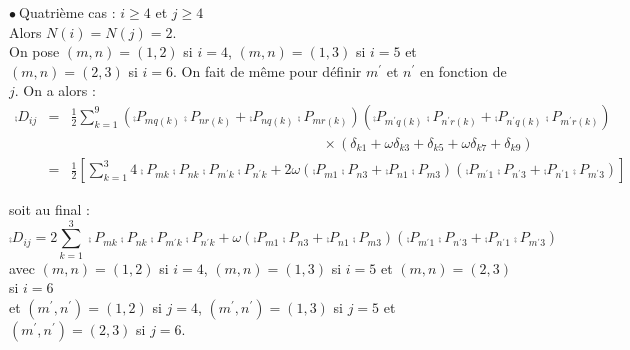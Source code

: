 \vspace{1cm}
$\bullet\ ${\sc Quatri\`eme cas} : $i\geqslant 4$ et $j\geqslant 4$\\
Alors $N(i)=N(j)=2$.\\
On pose $(m,n)=(1,2)$ si $i=4$, $(m,n)=(1,3)$ si $i=5$ et 
$(m,n)=(2,3)$ si $i=6$. On fait de m\^eme pour d\'efinir $m^\prime$ et
$n^\prime$ en fonction de $j$. On a alors :
\begin{eqnarray}
\comp{D}_{ij}&=&\frac{1}{2}\sum_{k=1}^9
\left(\comp{P}_{mq(k)}\comp{P}_{nr(k)}+\comp{P}_{nq(k)}\comp{P}_{mr(k)}\right)
\left(\comp{P}_{m^\prime q(k)}\comp{P}_{n^\prime r(k)}
+\comp{P}_{n^\prime q(k)}\comp{P}_{m^\prime r(k)}\right)\nonumber\\
&&\qquad\qquad\qquad\qquad\qquad\qquad\qquad\qquad\qquad\times
(\delta_{k1}+\omega\delta_{k3}+\delta_{k5}+\omega\delta_{k7}+\delta_{k9})\nonumber\\ 
&=&\frac{1}{2}\left[
\sum_{k=1}^3 4\comp{P}_{mk}\comp{P}_{nk}
\comp{P}_{m^\prime k}\comp{P}_{n^\prime k}
+2\omega\left(\comp{P}_{m1}\comp{P}_{n3}+\comp{P}_{n1}\comp{P}_{m3}\right)
\left(\comp{P}_{m^\prime 1}\comp{P}_{n^\prime 3}
+\comp{P}_{n^\prime 1}\comp{P}_{m^\prime 3}\right)\right]
\end{eqnarray}

soit au final :
\begin{equation}
\comp{D}_{ij}=
2\sum_{k=1}^3 \comp{P}_{mk}\comp{P}_{nk}
\comp{P}_{m^\prime k}\comp{P}_{n^\prime k}
+\omega\left(\comp{P}_{m1}\comp{P}_{n3}+\comp{P}_{n1}\comp{P}_{m3}\right)
\left(\comp{P}_{m^\prime 1}\comp{P}_{n^\prime 3}
+\comp{P}_{n^\prime 1}\comp{P}_{m^\prime 3}\right)
\end{equation}
avec $(m,n)=(1,2)$ si $i=4$, $(m,n)=(1,3)$ si $i=5$ et $(m,n)=(2,3)$ si
$i=6$\\
et $(m^\prime ,n^\prime )=(1,2)$ si $j=4$, $(m^\prime ,n^\prime )=(1,3)$ 
si $j=5$ et $(m^\prime ,n^\prime )=(2,3)$ si $j=6$.


